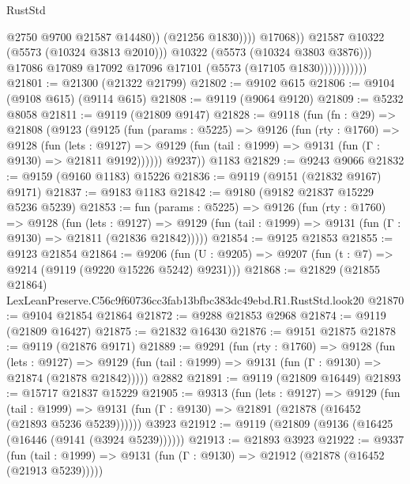\begin{lexlean}{RustStd}
\begin{coremodule}
                                        @2750
                                        @9700
                                        @21587
                                        @14480))
                                    (@21256 @1830))))
                              @17068))
                          @21587
                          @10322
                          (@5573 (@10324 @3813 @2010)))
                        @10322
                        (@5573 (@10324 @3803 @3876)))
                      @17086
                      @17089
                      @17092
                      @17096
                      @17101
                      (@5573 (@17105 @1830)))))))))))
@21801 := @21300 (@21322 @21799)
@21802 := @9102 @615
@21806 := @9104 (@9108 @615) (@9114 @615)
@21808 := @9119 (@9064 @9120)
@21809 := @5232 @8058
@21811 := @9119 (@21809 @9147)
@21828 := @9118
    (fun (fn : @29) =>
    @21808
      (@9123
        (@9125
          (fun (params : @5225) =>
          @9126
            (fun (rty : @1760) =>
            @9128
              (fun (lets : @9127) =>
              @9129 (fun (tail : @1999) => @9131 (fun (Γ : @9130) => @21811 @9192))))))
        @9237))
    @1183
@21829 := @9243 @9066
@21832 := @9159 (@9160 @1183) @15226
@21836 := @9119 (@9151 (@21832 @9167) @9171)
@21837 := @9183 @1183
@21842 := @9180 (@9182 @21837 @15229 @5236 @5239)
@21853 := fun (params : @5225) =>
  @9126
    (fun (rty : @1760) =>
    @9128
      (fun (lets : @9127) =>
      @9129 (fun (tail : @1999) => @9131 (fun (Γ : @9130) => @21811 (@21836 @21842)))))
@21854 := @9125 @21853
@21855 := @9123 @21854
@21864 := @9206
    (fun (U : @9205) => @9207 (fun (t : @7) => @9214 (@9119 (@9220 @15226 @5242) @9231)))
@21868 := @21829 (@21855 @21864) LexLeanPreserve.C56c9f60736cc3fab13bfbc383dc49ebd.R1.RustStd.look20
@21870 := @9104 @21854 @21864
@21872 := @9288 @21853 @2968
@21874 := @9119 (@21809 @16427)
@21875 := @21832 @16430
@21876 := @9151 @21875
@21878 := @9119 (@21876 @9171)
@21889 := @9291
    (fun (rty : @1760) =>
    @9128
      (fun (lets : @9127) =>
      @9129 (fun (tail : @1999) => @9131 (fun (Γ : @9130) => @21874 (@21878 @21842)))))
    @2882
@21891 := @9119 (@21809 @16449)
@21893 := @15717 @21837 @15229
@21905 := @9313
    (fun (lets : @9127) =>
    @9129
      (fun (tail : @1999) =>
      @9131 (fun (Γ : @9130) => @21891 (@21878 (@16452 (@21893 @5236 @5239))))))
    @3923
@21912 := @9119 (@21809 (@9136 (@16425 (@16446 (@9141 (@3924 @5239))))))
@21913 := @21893 @3923
@21922 := @9337
    (fun (tail : @1999) => @9131 (fun (Γ : @9130) => @21912 (@21878 (@16452 (@21913 @5239)))))

\end{coremodule}
\end{lexlean}
